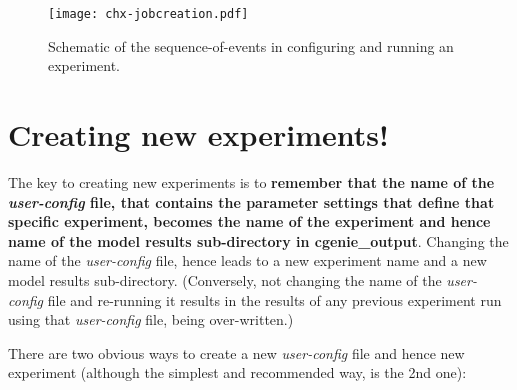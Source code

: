 \begin{figure}
\texttt{[image: chx-jobcreation.pdf]}\centering
\vspace{-0mm}
\caption{Schematic of the sequence-of-events in configuring and running an experiment.}
\label{fig:chx-jobcreation}
\end{figure}

\newpage

\section{Creating new experiments!}

The key to creating new experiments is to \textbf{remember that the name of the \textit{user-config} file, that contains the parameter settings that define that specific experiment, becomes the name of the experiment and hence name of the model results sub-directory in \textsf{\footnotesize cgenie\_output}}. Changing the name of the \textit{user-config} file, hence leads to a new experiment name and a new model results sub-directory. (Conversely, not changing the name of the  \textit{user-config} file and re-running it results in the results of any previous experiment run using that \textit{user-config} file, being over-written.)

\vspace{1mm}
There are two obvious ways to create a new \textit{user-config} file and hence new experiment (although the simplest and recommended way, is the 2nd one):

